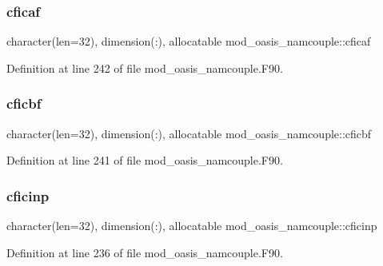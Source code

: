 \subsubsection{\texorpdfstring{cficaf}{cficaf}}
{\footnotesize\ttfamily character(len=32), dimension(\+:), allocatable mod\+\_\+oasis\+\_\+namcouple\+::cficaf\hspace{0.3cm}{\ttfamily [private]}}



Definition at line 242 of file mod\+\_\+oasis\+\_\+namcouple.\+F90.

\mbox{\label{namespacemod__oasis__namcouple_a0369f18e13cd2c3e4f9262499f967a6e}} 
\subsubsection{\texorpdfstring{cficbf}{cficbf}}
{\footnotesize\ttfamily character(len=32), dimension(\+:), allocatable mod\+\_\+oasis\+\_\+namcouple\+::cficbf\hspace{0.3cm}{\ttfamily [private]}}



Definition at line 241 of file mod\+\_\+oasis\+\_\+namcouple.\+F90.

\mbox{\label{namespacemod__oasis__namcouple_af17e746f51dcf0110428ebe55f6d7285}} 
\subsubsection{\texorpdfstring{cficinp}{cficinp}}
{\footnotesize\ttfamily character(len=32), dimension(\+:), allocatable mod\+\_\+oasis\+\_\+namcouple\+::cficinp\hspace{0.3cm}{\ttfamily [private]}}



Definition at line 236 of file mod\+\_\+oasis\+\_\+namcouple.\+F90.

\mbox{\label{namespacemod__oasis__namcouple_a6760c3952138ef35a5e2cd7b79238eaf}} 
